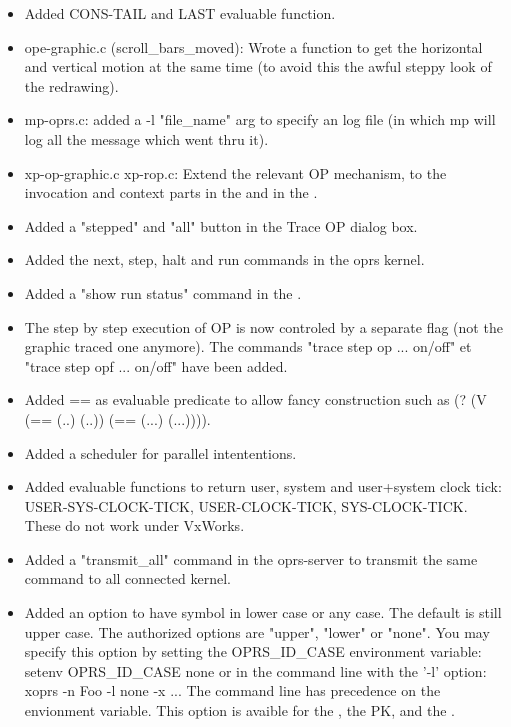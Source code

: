 \begin{itemize}

\item Added CONS-TAIL and LAST evaluable function.

\item ope-graphic.c (scroll\_bars\_moved): Wrote a function to get the
horizontal and vertical motion at the same time (to avoid this
the awful steppy look of the redrawing).

\item mp-oprs.c: added a -l "file\_name" arg to specify an log file
(in which mp will log all the message which went thru it).

\item xp-op-graphic.c xp-rop.c: Extend the relevant OP mechanism, to
the invocation and context parts in the \XPK{} and in the \OPE{}.

\item Added a "stepped" and "all" button in the Trace OP dialog box.

\item Added the next, step, halt and run commands in the oprs kernel.

\item Added a "show run status" command in the \CPK{}.

\item The step by step execution of OP is now controled by a separate
flag (not the graphic traced one anymore). The commands "trace
step op ... on/off" et "trace step opf ... on/off" have been
added.

\item Added == as evaluable predicate to allow fancy construction such
as (? (V (== (..) (..)) (== (...) (...)))).

\item Added a scheduler for parallel intententions.

\item Added evaluable functions to return
user, system and user+system clock tick:
USER-SYS-CLOCK-TICK, USER-CLOCK-TICK, SYS-CLOCK-TICK.
These do not work under VxWorks.
 
\item Added a "transmit\_all" command in the oprs-server to transmit the same
command to all connected kernel. 

\item Added an option to have symbol in lower case or any case.
The default is still upper case.
The authorized options are "upper", "lower" or "none".  
You may specify this option by setting the OPRS\_ID\_CASE
environment variable:\*
     setenv OPRS\_ID\_CASE none \*
or in the command line with the '-l' option:\*
     xoprs -n Foo -l none -x ...\*
The command line has precedence on the envionment variable.
This option is avaible for the \OPRSS{}, the PK{}, and the \OPE{}.


\end{itemize}
